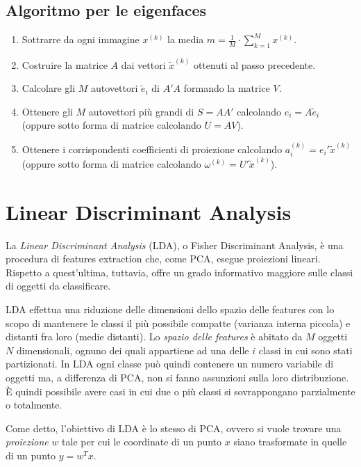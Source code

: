 \documentclass[a4paper,oneside,titlepage]{book}
\begin{document}
\subsection{Algoritmo per le eigenfaces}
\begin{enumerate}
    \item Sottrarre da ogni immagine $x^{(k)}$ la media $m = \frac{1}{M} \cdot \sum_{k=1}^M x^{(k)}$.
    \item Costruire la matrice $A$ dai vettori $\tilde{x}^{(k)}$ ottenuti al passo precedente.
    \item Calcolare gli $M$ autovettori $\tilde{e}_i$ di $A' A$ formando la matrice $V$.
    \item Ottenere gli $M$ autovettori più grandi di $S = A A'$ calcolando $e_i = A \tilde{e}_i$ (oppure sotto forma di matrice calcolando $U = A V$).
    \item Ottenere i corrispondenti coefficienti di proiezione calcolando $a_i^{(k)} = e_i' \tilde{x}^{(k)}$ (oppure sotto forma di matrice calcolando $\omega^{(k)} = U' \tilde{x}^{(k)}$).
\end{enumerate}

\section{Linear Discriminant Analysis}
La \textit{Linear Discriminant Analysis} (LDA), o Fisher Discriminant Analysis, è una procedura di features extraction che, come PCA, esegue proiezioni lineari. Rispetto a quest'ultima, tuttavia, offre un grado informativo maggiore sulle classi di oggetti da classificare.

LDA effettua una riduzione delle dimensioni dello spazio delle features con lo scopo di mantenere le classi il più possibile compatte (varianza interna piccola) e distanti fra loro (medie distanti). Lo \textit{spazio delle features} è abitato da $M$ oggetti $N$ dimensionali, ognuno dei quali appartiene ad una delle $i$ classi in cui sono stati partizionati. In LDA ogni classe può quindi contenere un numero variabile di oggetti ma, a differenza di PCA, non si fanno assunzioni sulla loro distribuzione. \`{E} quindi possibile avere casi in cui due o più classi si sovrappongano parzialmente o totalmente.

Come detto, l'obiettivo di LDA è lo stesso di PCA, ovvero si vuole trovare una \textit{proiezione} $w$ tale per cui le coordinate di un punto $x$ siano trasformate in quelle di un punto $y = w^T x$.
\end{document}
